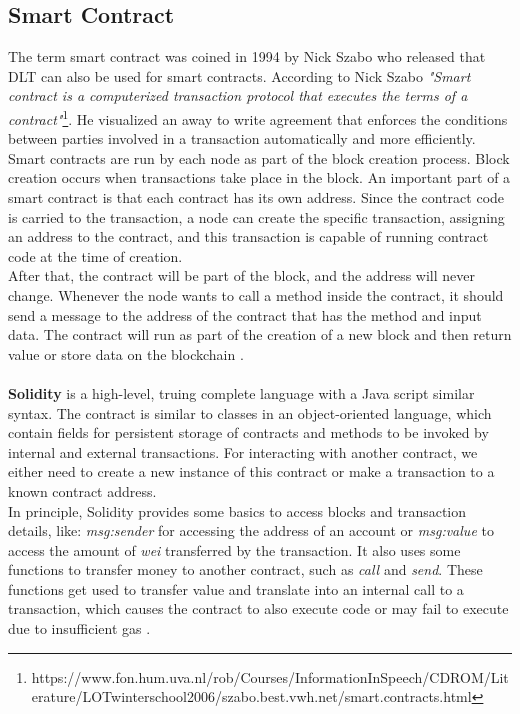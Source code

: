 \subsection{Smart Contract}
The term smart contract was coined in 1994 by Nick Szabo \cite{Szabo} who released that DLT can also be used for smart contracts.
According to Nick Szabo \textit{"Smart contract is a computerized transaction protocol that executes the terms of a contract"}\footnote{https://www.fon.hum.uva.nl/rob/Courses/InformationInSpeech/CDROM/Literature/LOTwinterschool2006/szabo.best.vwh.net/smart.contracts.html}. He visualized an away to write agreement that enforces the conditions between parties involved in a transaction automatically and more efficiently.
Smart contracts are run by each node as part of the block creation process. Block creation occurs when transactions take place in the block.
An important part of a smart contract is that each contract has its own address. Since the contract code is carried to the transaction, a node can create the specific transaction, assigning an address to the contract, and this transaction is capable of running contract code at the time of creation.\\
After that, the contract will be part of the block, and the address will never change. Whenever the node wants to call a method inside the contract, it should send a message to the address of the contract that has the method and input data.
The contract will run as part of the creation of a new block and then return value or store data on the blockchain \cite{Payrott}.\\
\\
\textbf{Solidity} is a high-level, truing complete language with a Java script similar syntax. The contract is similar to classes in an object-oriented language, which contain fields for persistent storage of contracts and methods to be invoked by internal and external transactions. For interacting with another contract, we either need to create a new instance of this contract or make a transaction to a known contract address.\\
In principle, Solidity provides some basics to access blocks and transaction details, like: \textit{msg:sender} for accessing the address of an account or \textit{msg:value} to access the amount of \textit{wei} transferred by the transaction. It also uses some functions to transfer money to another contract, such as \textit{call} and \textit{send}. These functions get used to transfer value and translate into an internal call to a transaction, which causes the contract to also execute code or may fail to execute due to insufficient gas \cite{Ilya}.